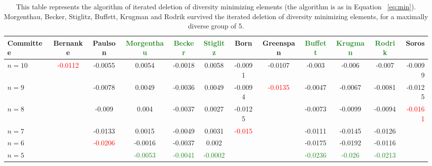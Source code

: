 \documentclass[12pt]{article}
\begin{document}
\begin{table}[h]\hspace*{-3.5cm}
\centering
\footnotesize
\begin{tabular}{l*{10}{c}r}
Committee & Bernanke & Paulson & \textcolor{ForestGreen}{Morgenthau} & \textcolor{ForestGreen}{Becker} & \textcolor{ForestGreen}{Stiglitz} & Born & Greenspan & \textcolor{ForestGreen}{Buffett} & \textcolor{ForestGreen}{Krugman} & \textcolor{ForestGreen}{Rodrik} & Soros\\
\hline
$n=10$ & \textcolor{red}{-0.0112} & -0.0055 & 0.0054 & -0.0018 & 0.0058 & -0.0091 & -0.0107 & -0.003 & -0.006 & -0.007 & -0.0099 \\
$n=9$ & & -0.0078 & 0.0049 & -0.0036 & 0.0049 & -0.0094 & \textcolor{red}{-0.0135} & -0.0047 & -0.0067 & -0.0081 & -0.0125\\
$n=8$ & & -0.009 & 0.004 & -0.0037 & 0.0027 & -0.0125 & & -0.0073 & -0.0099 & -0.0094 & \textcolor{red}{-0.0161}\\
$n=7$ & & -0.0133 & 0.0015 & -0.0049 & 0.0031 & \textcolor{red}{-0.015} & & -0.0111 & -0.0145 & -0.0126 & \\
$n=6$ & & \textcolor{red}{-0.0206} &-0.0016 & -0.0037 & 0.002 & & & -0.0175 & -0.0192 & -0.0116 & \\
\hline
$n=5$ & & &\textcolor{ForestGreen}{-0.0053} & \textcolor{ForestGreen}{-0.0041} & \textcolor{ForestGreen}{-0.0002}& & & \textcolor{ForestGreen}{-0.0236} & \textcolor{ForestGreen}{-0.026} & \textcolor{ForestGreen}{-0.0213} & \\
\end{tabular} \hspace*{-3.5cm}
\caption{This table represents the algorithm of iterated deletion of diversity minimizing elements (the algorithm is as in Equation ~\ref{eq:min}). Morgenthau, Becker, Stiglitz, Buffett, Krugman and Rodrik survived the iterated deletion of diversity minimizing elements, for a maximally diverse group of 5.} \label{table:minimize}
\end{table}
\end{document}
